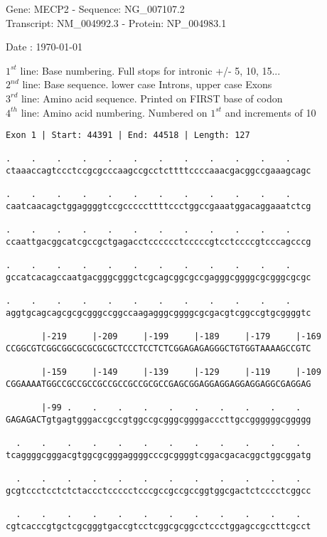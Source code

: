 \documentclass{article}
\begin{document}
\begin{center}
\begin{large}
Gene: MECP2 - Sequence: NG\_007107.2\\
Transcript: NM\_004992.3 - Protein: NP\_004983.1
 
 Date : \today
\end{large}
\end{center}
$1^{st}$ line: Base numbering. Full stops for intronic +/- 5, 10, 15...\\
$2^{nd}$ line: Base sequence. lower case Introns, upper case Exons\\
$3^{rd}$ line: Amino acid sequence. Printed on FIRST base of codon\\
$4^{th}$ line: Amino acid numbering. Numbered on $1^{st}$ and increments of 10\\
\begin{Verbatim}[fontfamily=courier]
Exon 1 | Start: 44391 | End: 44518 | Length: 127

.    .    .    .    .    .    .    .    .    .    .    .    
ctaaaccagtccctccgcgcccaagccgcctcttttccccaaacgacggccgaaagcagc

.    .    .    .    .    .    .    .    .    .    .    .    
caatcaacagctggaggggtccgcccccttttccctggccgaaatggacaggaaatctcg

.    .    .    .    .    .    .    .    .    .    .    .    
ccaattgacggcatcgccgctgagacctcccccctcccccgtcctccccgtcccagcccg

.    .    .    .    .    .    .    .    .    .    .    .    
gccatcacagccaatgacgggcgggctcgcagcggcgccgagggcggggcgcgggcgcgc

.    .    .    .    .    .    .    .    .    .    .    .    
aggtgcagcagcgcgcgggccggccaagagggcggggcgcgacgtcggccgtgcggggtc

       |-219     |-209     |-199     |-189     |-179     |-169
CCGGCGTCGGCGGCGCGCGCGCTCCCTCCTCTCGGAGAGAGGGCTGTGGTAAAAGCCGTC

       |-159     |-149     |-139     |-129     |-119     |-109
CGGAAAATGGCCGCCGCCGCCGCCGCCGCGCCGAGCGGAGGAGGAGGAGGAGGCGAGGAG

       |-99 .    .    .    .    .    .    .    .    .    .  
GAGAGACTgtgagtgggaccgccgtggccgcgggcggggacccttgccggggggcggggg

  .    .    .    .    .    .    .    .    .    .    .    .  
tcaggggcgggacgtggcgcgggaggggcccgcggggtcggacgacacggctggcggatg

  .    .    .    .    .    .    .    .    .    .    .    .  
gcgtccctcctctctaccctccccctcccgccgccgccggtggcgactctcccctcggcc

  .    .    .    .    .    .    .    .    .    .    .    .  
cgtcacccgtgctcgcgggtgaccgtcctcggcgcggcctccctggagccgccttcgcct

\end{Verbatim}
\end{document}
